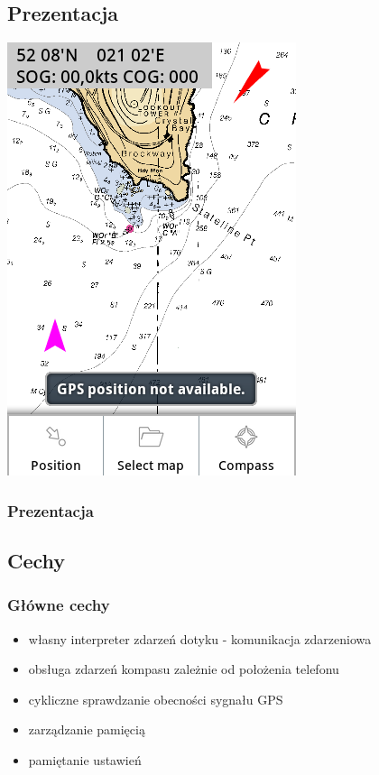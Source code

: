 \documentclass{beamer}
\begin{document}
\subsection{Prezentacja}
\begin{frame}
\begin{center}
\includegraphics[scale=0.45]{screen1}
\end{center}
\end{frame}

\begin{frame}
\frametitle{Prezentacja}
\end{frame}

\subsection{Cechy}
\begin{frame}
\frametitle{Główne cechy}
\begin{itemize}
	\item {własny interpreter zdarzeń dotyku - komunikacja zdarzeniowa}
	\item {obsługa zdarzeń kompasu zależnie od położenia telefonu}
	\item {cykliczne sprawdzanie obecności sygnału GPS}
	\item {zarządzanie pamięcią}
	\item {pamiętanie ustawień}
\end{itemize}
\end{frame}
\end{document}
